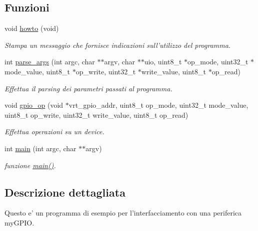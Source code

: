 \subsection*{Funzioni}
\begin{DoxyCompactItemize}
\item 
void \hyperlink{group___u_i_o-simple_ga05909651fa170a63e98e3f8e13451b7b}{howto} (void)
\begin{DoxyCompactList}\small\item\em Stampa un messaggio che fornisce indicazioni sull'utilizzo del programma. \end{DoxyCompactList}\item 
int \hyperlink{group___u_i_o-simple_gab6b18eb1bf7bc996599c06dc6dad8f53}{parse\+\_\+args} (int argc, char $\ast$$\ast$argv, char $\ast$$\ast$uio, uint8\+\_\+t $\ast$op\+\_\+mode, uint32\+\_\+t $\ast$mode\+\_\+value, uint8\+\_\+t $\ast$op\+\_\+write, uint32\+\_\+t $\ast$write\+\_\+value, uint8\+\_\+t $\ast$op\+\_\+read)
\begin{DoxyCompactList}\small\item\em Effettua il parsing dei parametri passati al programma. \end{DoxyCompactList}\item 
void \hyperlink{group___u_i_o-simple_ga879d8b839631449ecb5bc4d0721432b6}{gpio\+\_\+op} (void $\ast$vrt\+\_\+gpio\+\_\+addr, uint8\+\_\+t op\+\_\+mode, uint32\+\_\+t mode\+\_\+value, uint8\+\_\+t op\+\_\+write, uint32\+\_\+t write\+\_\+value, uint8\+\_\+t op\+\_\+read)
\begin{DoxyCompactList}\small\item\em Effettua operazioni su un device. \end{DoxyCompactList}\item 
int \hyperlink{group___u_i_o-simple_ga3c04138a5bfe5d72780bb7e82a18e627}{main} (int argc, char $\ast$$\ast$argv)
\begin{DoxyCompactList}\small\item\em funzione \hyperlink{group___u_i_o-simple_ga3c04138a5bfe5d72780bb7e82a18e627}{main()}. \end{DoxyCompactList}\end{DoxyCompactItemize}


\subsection{Descrizione dettagliata}
Questo e' un programma di esempio per l'interfacciamento con una periferica my\+G\+P\+I\+O. 

